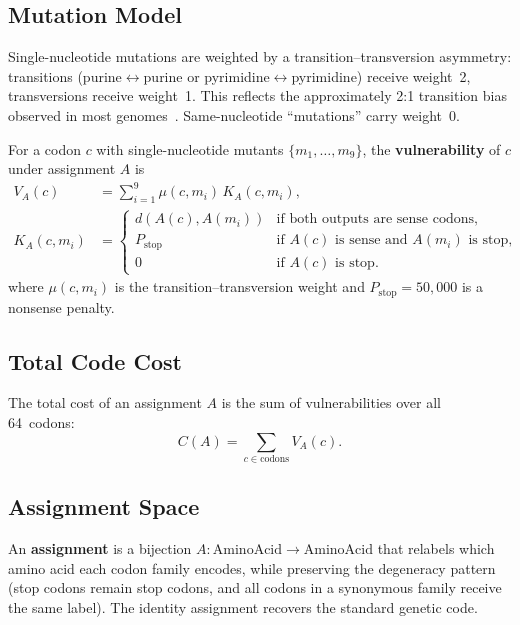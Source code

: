 \documentclass[11pt,twocolumn]{article}
\begin{document}
\subsection{Mutation Model}

Single-nucleotide mutations are weighted by a transition--transversion
asymmetry: transitions (purine$\leftrightarrow$purine or
pyrimidine$\leftrightarrow$pyrimidine) receive weight~2, transversions
receive weight~1. This reflects the approximately 2:1 transition bias
observed in most genomes~\citep{Wakeley1996}. Same-nucleotide ``mutations''
carry weight~0.

For a codon $c$ with single-nucleotide mutants $\{m_1, \ldots, m_9\}$,
the \textbf{vulnerability} of $c$ under assignment $A$ is
\begin{equation}\label{eq:vuln}
  \begin{aligned}
    V_A(c) &= \sum_{i=1}^{9} \mu(c, m_i)\, K_A(c,m_i), \\
    K_A(c,m_i) &=
    \begin{cases}
      d(A(c), A(m_i)) & \text{if both outputs are sense codons,} \\
      P_{\text{stop}} & \text{if } A(c) \text{ is sense and } A(m_i) \text{ is stop,} \\
      0 & \text{if } A(c) \text{ is stop.}
    \end{cases}
  \end{aligned}
\end{equation}
where $\mu(c, m_i)$ is the transition--transversion weight and
$P_{\text{stop}} = 50{,}000$ is a nonsense penalty.

\subsection{Total Code Cost}

The total cost of an assignment $A$ is the sum of vulnerabilities over all
64~codons:
\begin{equation}\label{eq:total}
  C(A) = \sum_{c \in \text{codons}} V_A(c).
\end{equation}

\subsection{Assignment Space}

An \textbf{assignment} is a bijection $A\colon \text{AminoAcid} \to
\text{AminoAcid}$ that relabels which amino acid each codon family encodes,
while preserving the degeneracy pattern (stop codons remain stop codons,
and all codons in a synonymous family receive the same label). The identity
assignment recovers the standard genetic code.
\end{document}
